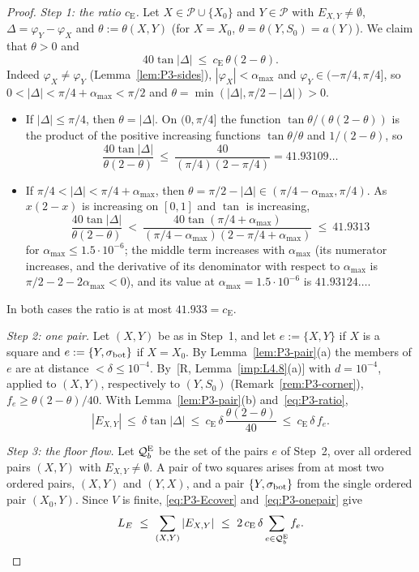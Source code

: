 \documentclass[11pt]{amsart}
\newcommand{\cP}{\mathcal P}
\newcommand{\amax}{\alpha_{\max}}
\theoremstyle{definition}
\theoremstyle{remark}
\numberwithin{equation}{section}
\begin{document}
\begin{proof}
\emph{Step 1: the ratio $c_{\mathrm E}$.} Let $X\in\cP\cup\{X_0\}$ and $Y\in\cP$ with $E_{X,Y}\ne\emptyset$, $\Delta=\varphi_Y-\varphi_X$ and $\theta:=\theta(X,Y)$ (for $X=X_0$, $\theta=\theta(Y,S_0)=a(Y)$). We claim that $\theta>0$ and
\begin{equation}\label{eq:P3-ratio}
40\tan|\Delta|\ \le\ c_{\mathrm E}\,\theta(2-\theta).
\end{equation}
Indeed $\varphi_X\ne\varphi_Y$ (Lemma~\ref{lem:P3-sides}), $|\varphi_X|<\amax$ and $\varphi_Y\in(-\pi/4,\pi/4]$, so $0<|\Delta|<\pi/4+\amax<\pi/2$ and $\theta=\min(|\Delta|,\pi/2-|\Delta|)>0$.
\begin{itemize}
\item If $|\Delta|\le\pi/4$, then $\theta=|\Delta|$. On $(0,\pi/4]$ the function $\tan\theta/(\theta(2-\theta))$ is the product of the positive increasing functions $\tan\theta/\theta$ and $1/(2-\theta)$, so
\[
\frac{40\tan|\Delta|}{\theta(2-\theta)}\ \le\ \frac{40}{(\pi/4)(2-\pi/4)}=41.93109\ldots
\]
\item If $\pi/4<|\Delta|<\pi/4+\amax$, then $\theta=\pi/2-|\Delta|\in(\pi/4-\amax,\pi/4)$. As $x(2-x)$ is increasing on $[0,1]$ and $\tan$ is increasing,
\[
\frac{40\tan|\Delta|}{\theta(2-\theta)}\ <\ \frac{40\tan(\pi/4+\amax)}{(\pi/4-\amax)(2-\pi/4+\amax)}\ \le\ 41.9313
\]
for $\amax\le1.5\cdot10^{-6}$; the middle term increases with $\amax$ (its numerator increases, and the derivative of its denominator with respect to $\amax$ is $\pi/2-2-2\amax<0$), and its value at $\amax=1.5\cdot10^{-6}$ is $41.93124\ldots$.
\end{itemize}
In both cases the ratio is at most $41.933=c_{\mathrm E}$.

\emph{Step 2: one pair.} Let $(X,Y)$ be as in Step~1, and let $e:=\{X,Y\}$ if $X$ is a square and $e:=\{Y,\sigma_{\rm bot}\}$ if $X=X_0$. By Lemma~\ref{lem:P3-pair}(a) the members of $e$ are at distance $<\delta\le10^{-4}$. By~[R, Lemma~\ref{imp:L4.8}(a)] with $d=10^{-4}$, applied to $(X,Y)$, respectively to $(Y,S_0)$ (Remark~\ref{rem:P3-corner}), $f_e\ge\theta(2-\theta)/40$. With Lemma~\ref{lem:P3-pair}(b) and~\eqref{eq:P3-ratio},
\begin{equation}\label{eq:P3-onepair}
|E_{X,Y}|\ \le\ \delta\tan|\Delta|\ \le\ c_{\mathrm E}\,\delta\,\frac{\theta(2-\theta)}{40}\ \le\ c_{\mathrm E}\,\delta\,f_e .
\end{equation}

\emph{Step 3: the floor flow.} Let $\mathcal Q^{\rm E}_b$ be the set of the pairs $e$ of Step~2, over all ordered pairs $(X,Y)$ with $E_{X,Y}\ne\emptyset$. A pair of two squares arises from at most two ordered pairs, $(X,Y)$ and $(Y,X)$, and a pair $\{Y,\sigma_{\rm bot}\}$ from the single ordered pair $(X_0,Y)$. Since $V$ is finite, \eqref{eq:P3-Ecover} and~\eqref{eq:P3-onepair} give
\[
L_E\ \le\ \sum_{(X,Y)}|E_{X,Y}|\ \le\ 2\,c_{\mathrm E}\,\delta\sum_{e\in\mathcal Q^{\rm E}_b}f_e .
\]


\end{proof}
\end{document}
